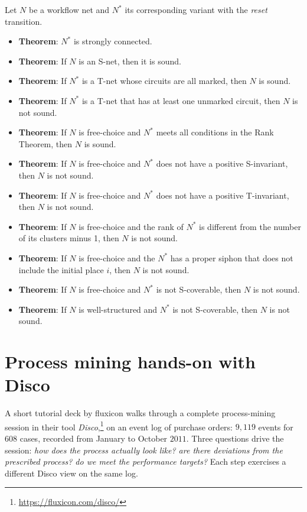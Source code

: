 \bigskip
Let $N$ be a workflow net and $N^*$ its corresponding variant with the \emph{reset} transition.
\begin{itemize}
  \item \textbf{Theorem}: $N^*$ is strongly connected.
  \item \textbf{Theorem}: If $N$ is an S-net, then it is sound.
  \item \textbf{Theorem}: If $N^*$ is a T-net whose circuits are all marked, then $N$ is sound.
  \item \textbf{Theorem}: If $N^*$ is a T-net that has at least one unmarked circuit, then $N$ is not sound.
  \item \textbf{Theorem}: If $N$ is free-choice and $N^*$ meets all conditions in the Rank Theorem, then $N$ is sound.
  \item \textbf{Theorem}: If $N$ is free-choice and $N^*$ does not have a positive S-invariant, then $N$ is not sound.
  \item \textbf{Theorem}: If $N$ is free-choice and $N^*$ does not have a positive T-invariant, then $N$ is not sound.
  \item \textbf{Theorem}: If $N$ is free-choice and the rank of $N^*$ is different from the number of its clusters minus 1, then $N$ is not sound.
  \item \textbf{Theorem}: If $N$ is free-choice and the $N^*$ has a proper siphon that does not include the initial place $i$, then $N$ is not sound.
  \item \textbf{Theorem}: If $N$ is free-choice and $N^*$ is not S-coverable, then $N$ is not sound.
  \item \textbf{Theorem}: If $N$ is well-structured and $N^*$ is not S-coverable, then $N$ is not sound.
\end{itemize}

\normalsize


\newpage
\section{Process mining hands-on with Disco}

A short tutorial deck by fluxicon walks through a complete process-mining session in their tool \emph{Disco},\footnote{\url{https://fluxicon.com/disco/}} on an event log of purchase orders: $9{,}119$ events for $608$ cases, recorded from January to October $2011$. Three questions drive the session: \emph{how does the process actually look like? are there deviations from the prescribed process? do we meet the performance targets?} Each step exercises a different Disco view on the same log.

